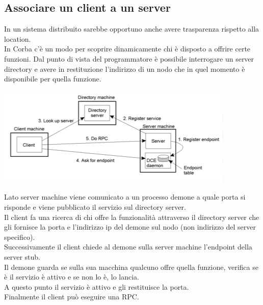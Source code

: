 \subsection{Associare un client a un server}
In un sistema distribuito sarebbe opportuno anche avere trasparenza rispetto alla location. \\
In Corba c'è un modo per scoprire dinamicamente chi è disposto a offrire certe funzioni. Dal punto di vista del programmatore è possibile interrogare un server directory e avere in restituzione l'indirizzo di un nodo che in quel momento è disponibile per quella funzione.
\begin{center}
    \includegraphics[width = .7\textwidth]{images/lezione3/bindingclientserver.png}
\end{center}
Lato server machine viene comunicato a un processo demone a quale porta si risponde e viene pubblicato il servizio sul directory server. \\
Il client fa una ricerca di chi offre la funzionalità attraverso il directory server che gli fornisce la porta e l'indirizzo ip del demone sul nodo (non indirizzo del server specifico).\\
Successivamente il client chiede al demone sulla server machine l'endpoint della server stub. \\
Il demone guarda se sulla sua macchina qualcuno offre quella funzione, verifica se è il servizio è attivo e se non lo è, lo lancia. \\
A questo punto il servizio è attivo e gli restituisce la porta. \\
Finalmente il client può eseguire una RPC. \\


